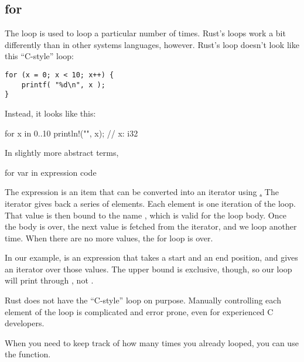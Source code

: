 \subsection*{for}

The  loop is used to loop a particular number of times. Rust's  loops work a bit differently than in other 
systems languages, however. Rust's  loop doesn't look like this “C-style”  loop:

\begin{verbatim}
for (x = 0; x < 10; x++) {
    printf( "%d\n", x );
}
\end{verbatim}

Instead, it looks like this:

\begin{rustc}
for x in 0..10 {
    println!("{}", x); // x: i32
}
\end{rustc}

In slightly more abstract terms,

\begin{rustc}
for var in expression {
    code
}
\end{rustc}

The expression is an item that can be converted into an iterator using 
\href{https://doc.rust-lang.org/std/iter/trait.IntoIterator.html\{IntoIterator}. The iterator gives back a series of elements. Each 
element is one iteration of the loop. That value is then bound to the name , which is valid for the loop body. Once the 
body is over, the next value is fetched from the iterator, and we loop another time. When there are no more values, the for loop is 
over.

\blank

In our example,  is an expression that takes a start and an end position, and gives an iterator over those values. 
The upper bound is exclusive, though, so our loop will print  through , not .

\blank

Rust does not have the “C-style”  loop on purpose. Manually controlling each element of the loop is complicated and 
error prone, even for experienced C developers.


When you need to keep track of how many times you already looped, you can use the  function.


